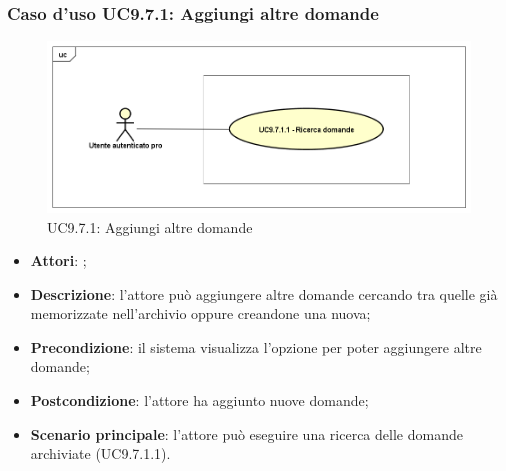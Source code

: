 		 \subsubsection{Caso d'uso UC9.7.1: Aggiungi altre domande}
		 \label{UC9.7.1}
		 \begin{figure}[h]
		 	\centering
		 	\includegraphics[scale=0.5,keepaspectratio]{UML/UC9_7_1.png}
		 	\caption{UC9.7.1: Aggiungi altre domande}
		 \end{figure}
		 \FloatBarrier
		 \begin{itemize}
		 	\item \textbf{Attori}: \uaupro{};
		 	\item \textbf{Descrizione}: l'attore può aggiungere altre domande cercando tra quelle già memorizzate nell'archivio oppure creandone una nuova; 
		 	\item \textbf{Precondizione}: il sistema visualizza l'opzione per poter aggiungere altre domande;
		 	\item \textbf{Postcondizione}: l'attore ha aggiunto nuove domande;
		 	\item \textbf{Scenario principale}: l'attore può eseguire una ricerca delle domande archiviate (UC9.7.1.1).
		 \end{itemize}
		 
